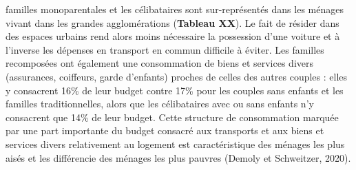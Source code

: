 \documentclass[
  12pt,
]{book}
\begin{document}
familles monoparentales et les célibataires sont sur-représentés dans
les ménages vivant dans les grandes agglomérations (\textbf{Tableau
XX}). Le fait de résider dans des espaces urbains rend alors moins
nécessaire la possession d'une voiture et à l'inverse les dépenses en
transport en commun difficile à éviter. Les familles recomposées ont
également une consommation de biens et services divers (assurances,
coiffeurs, garde d'enfants) proches de celles des autres couples : elles
y consacrent 16\% de leur budget contre 17\% pour les couples sans
enfants et les familles traditionnelles, alors que les célibataires avec
ou sans enfants n'y consacrent que 14\% de leur budget. Cette structure
de consommation marquée par une part importante du budget consacré aux
transports et aux biens et services divers relativement au logement est
caractéristique des ménages les plus aisés et les différencie des
ménages les plus pauvres (Demoly et Schweitzer, 2020).
\end{document}

